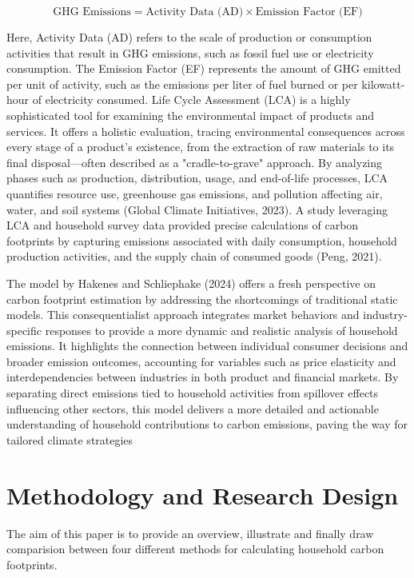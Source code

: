 \documentclass[12pt,a4paper]{article}
\begin{document}
\[
\text{GHG Emissions} = \text{Activity Data (AD)} \times \text{Emission Factor (EF)}
\]

Here, Activity Data (AD) refers to the scale of production or consumption activities that result in GHG emissions, such as fossil fuel use or electricity consumption. The Emission Factor (EF) represents the amount of GHG emitted per unit of activity, such as the emissions per liter of fuel burned or per kilowatt-hour of electricity consumed. Life Cycle Assessment (LCA) is a highly sophisticated tool for examining the environmental impact of products and services. It offers a holistic evaluation, tracing environmental consequences across every stage of a product's existence, from the extraction of raw materials to its final disposal—often described as a "cradle-to-grave" approach. By analyzing phases such as production, distribution, usage, and end-of-life processes, LCA quantifies resource use, greenhouse gas emissions, and pollution affecting air, water, and soil systems (Global Climate Initiatives, 2023). A study leveraging LCA and household survey data provided precise calculations of carbon footprints by capturing emissions associated with daily consumption, household production activities, and the supply chain of consumed goods (Peng, 2021).

\vspace{5 pt}
The model by Hakenes and Schliephake (2024) offers a fresh perspective on carbon footprint estimation by addressing the shortcomings of traditional static models. This consequentialist approach integrates market behaviors and industry-specific responses to provide a more dynamic and realistic analysis of household emissions. It highlights the connection between individual consumer decisions and broader emission outcomes, accounting for variables such as price elasticity and interdependencies between industries in both product and financial markets. By separating direct emissions tied to household activities from spillover effects influencing other sectors, this model delivers a more detailed and actionable understanding of household contributions to carbon emissions, paving the way for tailored climate strategies
\section{Methodology and Research Design}

The aim of this paper is to provide an overview, illustrate and finally draw comparision between four different methods for calculating household carbon footprints. 
\end{document}
